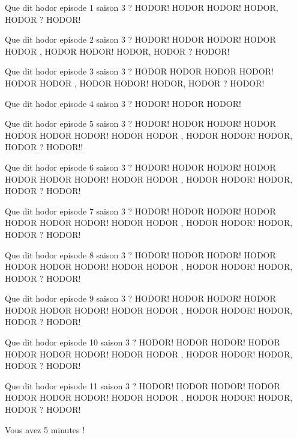 \documentclass[a4paper, 11pt]{article}
\begin{document}
	\begin{qcm}
	
		\question Que dit hodor episode 1 saison 3 ?
			\reponsejuste HODOR!
			\reponse HODOR HODOR!
			\reponsejuste HODOR, HODOR ? HODOR!
			
		\question Que dit hodor episode 2 saison 3 ?
			\reponse HODOR!
			\reponsejuste HODOR HODOR!
			\reponsejuste HODOR HODOR , HODOR HODOR!
			\reponse HODOR, HODOR ? HODOR!

		\question Que dit hodor episode 3 saison 3 ?
			\reponsejuste HODOR HODOR HODOR HODOR!
			\reponse HODOR HODOR , HODOR HODOR!
			\reponse HODOR, HODOR ? HODOR!

		\question Que dit hodor episode 4 saison 3 ?
			\reponse HODOR!
			\reponsejuste HODOR HODOR!

		\question Que dit hodor episode 5 saison 3 ?
			\reponsejuste HODOR!
			\reponse HODOR HODOR!
			\reponse HODOR HODOR HODOR HODOR!
			\reponse HODOR HODOR , HODOR HODOR!
			\reponsejuste HODOR, HODOR ? HODOR!!

		\question Que dit hodor episode 6 saison 3 ?
			\reponse HODOR!
			\reponsejuste HODOR HODOR!
			\reponse HODOR HODOR HODOR HODOR!
			\reponsejuste HODOR HODOR , HODOR HODOR!
			\reponse HODOR, HODOR ? HODOR!

		\question Que dit hodor episode 7 saison 3 ?
			\reponse HODOR!
			\reponse HODOR HODOR!
			\reponsejuste HODOR HODOR HODOR HODOR!
			\reponse HODOR HODOR , HODOR HODOR!
			\reponse HODOR, HODOR ? HODOR!

		\question Que dit hodor episode 8 saison 3 ?
			\reponse HODOR!
			\reponsejuste HODOR HODOR!
			\reponse HODOR HODOR HODOR HODOR!
			\reponsejuste HODOR HODOR , HODOR HODOR!
			\reponse HODOR, HODOR ? HODOR!

		\question Que dit hodor episode 9 saison 3 ?
			\reponsejuste HODOR!
			\reponse HODOR HODOR!
			\reponse HODOR HODOR HODOR HODOR!
			\reponse HODOR HODOR , HODOR HODOR!
			\reponsejuste HODOR, HODOR ? HODOR!

		\question Que dit hodor episode 10 saison 3 ?
			\reponse HODOR!
			\reponsejuste HODOR HODOR!
			\reponse HODOR HODOR HODOR HODOR!
			\reponsejuste HODOR HODOR , HODOR HODOR!
			\reponse HODOR, HODOR ? HODOR!

		\question Que dit hodor episode 11 saison 3 ?
			\reponse HODOR!
			\reponse HODOR HODOR!
			\reponsejuste HODOR HODOR HODOR HODOR!
			\reponse HODOR HODOR , HODOR HODOR!
			\reponse HODOR, HODOR ? HODOR!
		
		\end{qcm}
	
	Vous avez 5 minutes !
	
\end{document}
